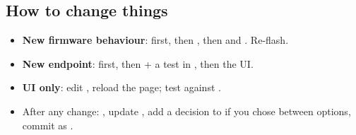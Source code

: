 \subsection{How to change things}
\begin{itemize}
\item \textbf{New firmware behaviour}:  first, then ,
then  and . Re-flash.
\item \textbf{New endpoint}:  first, then  + a test in
, then the UI.
\item \textbf{UI only}: edit , reload the page; test against .
\item After any change: , update , add a decision to
 if you chose between options, commit as .
\end{itemize}
